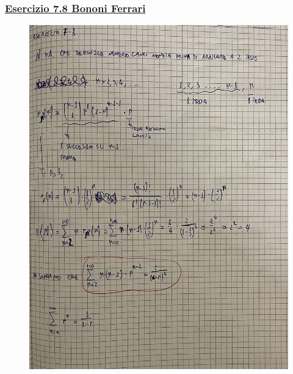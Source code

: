 \documentclass{article}
\begin{document}
\subsubsection{\underline{Esercizio 7.8 Bononi Ferrari}}
\begin{figure}[H]
\centering
\includegraphics[scale=0.10]{ese/38.jpeg}
\end{figure}
\end{document}
